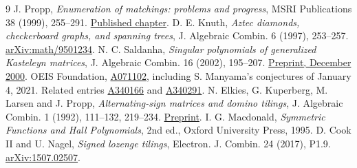 \documentclass[11pt,letterpaper]{article}
\begin{document}
{\small
\begin{thebibliography}{9}\setlength{\itemsep}{1pt}
 J. Propp, \emph{Enumeration of matchings: problems and progress}, MSRI Publications 38 (1999), 255--291. \href{https://library.slmath.org/books/Book38/files/propp.pdf}{Published chapter}.
 D. E. Knuth, \emph{Aztec diamonds, checkerboard graphs, and spanning trees}, J. Algebraic Combin. 6 (1997), 253--257. \href{https://arxiv.org/abs/math/9501234}{arXiv:math/9501234}.
 N. C. Saldanha, \emph{Singular polynomials of generalized Kasteleyn matrices}, J. Algebraic Combin. 16 (2002), 195--207. \href{https://arxiv.org/abs/math/0101002}{Preprint, December 2000}.
 OEIS Foundation, \href{https://oeis.org/A071102}{A071102}, including S. Manyama's conjectures of January 4, 2021. Related entries \href{https://oeis.org/A340166}{A340166} and \href{https://oeis.org/A340291}{A340291}.
 N. Elkies, G. Kuperberg, M. Larsen and J. Propp, \emph{Alternating-sign matrices and domino tilings}, J. Algebraic Combin. 1 (1992), 111--132, 219--234. \href{https://arxiv.org/abs/math/9201305}{Preprint}.
 I. G. Macdonald, \emph{Symmetric Functions and Hall Polynomials}, 2nd ed., Oxford University Press, 1995.
 D. Cook II and U. Nagel, \emph{Signed lozenge tilings}, Electron. J. Combin. 24 (2017), P1.9. \href{https://arxiv.org/abs/1507.02507}{arXiv:1507.02507}.
\end{thebibliography}}
\end{document}
